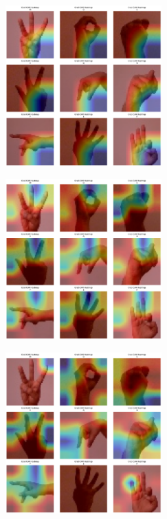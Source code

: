 \begin{multicols}{2}
\includegraphics[width=0.45\textwidth]{Assets/gradcam_heatmap/EfficientNetB0.png}

\vspace{0.8cm}

\includegraphics[width=0.45\textwidth]{Assets/gradcam_heatmap/EfficientNetV2L.png}

\vspace{0.8cm}

\newpage

\includegraphics[width=0.45\textwidth]{Assets/gradcam_heatmap/MOBILENETV2.png}

\vspace{0.8cm}


\end{multicols}
